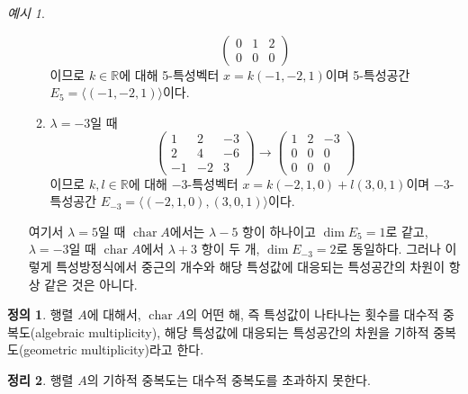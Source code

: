 \documentclass[unfonts,oneside,a4paper]{oblivoir}
\theoremstyle{definition}
\newtheorem{definition}{정의}[section]
\theoremstyle{theorem}
\newtheorem{theorem}[definition]{정리}
\theoremstyle{theorem}
\theoremstyle{remark}
\theoremstyle{remark}
\theoremstyle{remark}
\newtheorem*{example}{예시}
\theoremstyle{remark}
\renewcommand{\vec}[1]{\bm{\mathit{#1}}}
\DeclareMathOperator{\Char}{char}
\begin{document}
\begin{example}
\begin{enumerate}
\begin{enumerate}
\begin{equation*}
\begin{pmatrix}
                            0 & 1 & 2\\
                            0 & 0 & 0
                        \end{pmatrix}
                    \end{equation*}
                    이므로 $k \in \mathbb R$에 대해 5-특성벡터 $\vec x = k(-1, -2, 1)$이며 5-특성공간 $E_5 = \langle (-1, -2, 1) \rangle$이다.
                \item $\lambda = -3$일 때
                    \begin{equation*}
                        \begin{pmatrix}
                            1 & 2 & -3\\
                            2 & 4 & -6\\
                            -1 & -2 & 3
                        \end{pmatrix}
                        \rightarrow
                        \begin{pmatrix}
                            1 & 2 & -3\\
                            0 & 0 & 0\\
                            0 & 0 & 0
                        \end{pmatrix}
                    \end{equation*}
                    이므로 $k, l \in \mathbb R$에 대해 $-3$-특성벡터 $\vec x = k(-2, 1, 0) + l(3, 0, 1)$이며 $-3$-특성공간 $E_{-3} = \langle (-2, 1, 0), (3, 0, 1)\rangle$이다.
            \end{enumerate}
            여기서 $\lambda = 5$일 때 $\Char A$에서는 $\lambda - 5$ 항이 하나이고 $\dim E_5 = 1$로 같고, $\lambda = -3$일 때 $\Char A$에서 $\lambda + 3$ 항이 두 개, $\dim E_{-3} = 2$로 동일하다.
            그러나 이렇게 특성방정식에서 중근의 개수와 해당 특성값에 대응되는 특성공간의 차원이 항상 같은 것은 아니다.
    \end{enumerate}
\end{example}

\begin{definition}
    행렬 $A$에 대해서, $\Char A$의 어떤 해, 즉 특성값이 나타나는 횟수를 대수적 중복도(algebraic multiplicity), 해당 특성값에 대응되는 특성공간의 차원을 기하적 중복도(geometric multiplicity)라고 한다.
\end{definition}

\begin{theorem}
    행렬 $A$의 기하적 중복도는 대수적 중복도를 초과하지 못한다.
\end{theorem}
\end{document}
